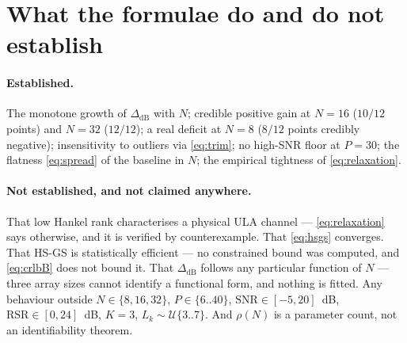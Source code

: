 \documentclass[11pt,a4paper]{article}
\newcommand{\Unif}{\mathcal{U}}
\newcommand{\SNR}{\mathrm{SNR}}
\newcommand{\RSR}{\mathrm{RSR}}
\newcommand{\dB}{\mathrm{dB}}
\begin{document}
\section{What the formulae do and do not establish}

\paragraph{Established.} The monotone growth of $\Delta_{\dB}$ with $N$;
credible positive gain at $N=16$ ($10/12$ points) and $N=32$ ($12/12$); a real
deficit at $N=8$ ($8/12$ points credibly negative); insensitivity to outliers
via \eqref{eq:trim}; no high-SNR floor at $P=30$; the flatness \eqref{eq:spread}
of the baseline in $N$; the empirical tightness of \eqref{eq:relaxation}.

\paragraph{Not established, and not claimed anywhere.}
That low Hankel rank characterises a physical ULA channel --- \eqref{eq:relaxation}
says otherwise, and it is verified by counterexample. That \eqref{eq:hsgs}
converges. That HS-GS is statistically efficient --- no constrained bound was
computed, and \eqref{eq:crlbB} does not bound it. That $\Delta_{\dB}$ follows
any particular function of $N$ --- three array sizes cannot identify a
functional form, and nothing is fitted. Any behaviour outside
$N\in\{8,16,32\}$, $P\in\{6..40\}$, $\SNR\in[-5,20]$~dB, $\RSR\in[0,24]$~dB,
$K=3$, $L_k\sim\Unif\{3..7\}$. And $\rho(N)$ is a parameter count, not an
identifiability theorem.
\end{document}
